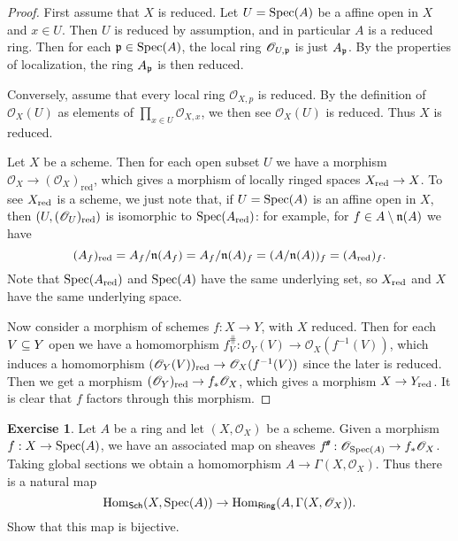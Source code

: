 \documentclass[11pt]{book}
\theoremstyle{definition}
\newtheorem{exercise}{Exercise}[section]
\begin{document}
\begin{proof}
First assume that $X$ is reduced. Let $U=\mathrm{Spec}(A)$ be a affine open in $X$ and $x\in U$. Then $U$ is reduced by assumption, and in particular $A$ is a reduced ring. Then for each $\mathfrak{p}\in\mathrm{Spec}(A)$, the local ring $\mathscr{O}_{U,\mathfrak{p}}$ is just $A_{\mathfrak{p}}$. By the properties of localization, the ring $A_{\mathfrak{p}}$ is then reduced.\par
Conversely, assume that every local ring $\mathscr{O}_{X,p}$ is reduced. By the definition of $\mathscr{O}_X(U)$ as elements of $\prod_{x\in U}\mathscr{O}_{X,x}$, we then see $\mathscr{O}_X(U)$ is reduced. Thus $X$ is reduced.\par
Let $X$ be a scheme. Then for each open subset $U$ we have a morphism $\mathscr{O}_X\to(\mathscr{O}_X)_{\text{red}}$, which gives a morphism of locally ringed spaces $X_{\mathrm{red}}\to X$. To see $X_{\mathrm{red}}$ is a scheme, we just note that, if $U=\mathrm{Spec}(A)$ is an affine open in $X$, then $(U,(\mathscr{O}_U)_{\mathrm{red}})$ is isomorphic to $\mathrm{Spec}(A_{\mathrm{red}})$: for example, for $f\in A\setminus\mathfrak{n}(A)$ we have
\[(A_f)_{\mathrm{red}}=A_f/\mathfrak{n}(A_f)=A_f/\mathfrak{n}(A)_f=(A/\mathfrak{n}(A))_f=(A_{\mathrm{red}})_f.\]
Note that $\mathrm{Spec}(A_{\mathrm{red}})$ and $\mathrm{Spec}(A)$ have the same underlying set, so $X_{\mathrm{red}}$ and $X$ have the same underlying space.\par
Now consider a morphism of schemes $f:X\to Y$, with $X$ reduced. Then for each $V\subseteq Y$ open we have a homomorphism $f^{\hash}_V:\mathscr{O}_Y(V)\to\mathscr{O}_X(f^{-1}(V))$, which induces a homomorphism $(\mathscr{O}_Y(V))_{\mathrm{red}}\to\mathscr{O}_X(f^{-1}(V))$ since the later is reduced. Then we get a morphism $(\mathscr{O}_Y)_{\mathrm{red}}\to f_*\mathscr{O}_X$, which gives a morphism $X\to Y_{\mathrm{red}}$. It is clear that $f$ factors through this morphism. 
\end{proof}
\begin{exercise}
Let $A$ be a ring and let $(X,\mathscr{O}_X)$ be a scheme. Given a morphism $f:X\to\mathrm{Spec}(A)$, we have an associated map on sheaves $f^{\!\textit{\texttt{\#}}}:\mathscr{O}_{\mathrm{Spec}(A)}\to f_*\mathscr{O}_X$. Taking global sections we obtain a homomorphism $A\to\Gamma(X,\mathscr{O}_X)$. Thus there is a natural map
\[\mathrm{Hom}_{\mathsf{Sch}}(X,\mathrm{Spec}(A))\to\mathrm{Hom}_{\mathsf{Ring}}(A,\Gamma(X,\mathscr{O}_X)).\]
Show that this map is bijective.
\end{exercise}
\end{document}
